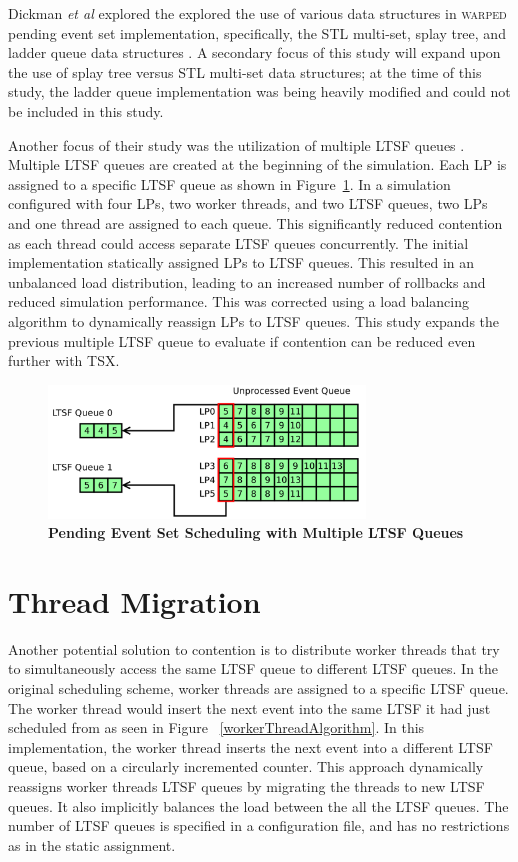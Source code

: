 \documentclass[11pt]{book}
\begin{document}
Dickman \emph{et al} explored the explored the use of various data structures in \textsc{warped}
pending event set implementation, specifically, the STL multi-set, splay tree, and ladder
queue data structures \cite{dickman}.  A secondary focus of this study will expand upon
the use of splay tree versus STL multi-set data structures; at the time of this study, the
ladder queue implementation was being heavily modified and could not be included in this
study.

Another focus of their study was the utilization of multiple LTSF queues \cite{dickman}.
Multiple LTSF queues are created at the beginning of the simulation.  Each LP is assigned
to a specific LTSF queue as shown in Figure~\ref{fig:multipleLTSF}.  In a simulation
configured with four LPs, two worker threads, and two LTSF queues, two LPs and one thread
are assigned to each queue.  This significantly reduced contention as each thread could
access separate LTSF queues concurrently.  The initial implementation statically assigned
LPs to LTSF queues.  This resulted in an unbalanced load distribution, leading to an
increased number of rollbacks and reduced simulation performance.  This was corrected
using a load balancing algorithm to dynamically reassign LPs to LTSF queues.  This study
expands the previous multiple LTSF queue to evaluate if contention can be reduced even
further with TSX.

\begin{figure}[H]
    \centering
    \graphicspath{ {./figures/} }
    \includegraphics[width=0.75\textwidth,keepaspectratio]{multiple_ltsf}
    \caption{\textbf{Pending Event Set Scheduling with Multiple LTSF
        Queues}}\label{fig:multipleLTSF}
\end{figure}

\section{Thread Migration}

Another potential solution to contention is to distribute worker threads that
try to simultaneously access the same LTSF queue to different LTSF queues.  In
the original scheduling scheme, worker threads are assigned to a specific LTSF
queue.  The worker thread would insert the next event into the same LTSF it had
just scheduled from as seen in Figure ~\ref{workerThreadAlgorithm}.  In this
implementation, the worker thread inserts the next event into a different LTSF
queue, based on a circularly incremented counter.  This approach dynamically
reassigns worker threads LTSF queues by migrating the threads to new LTSF
queues.  It also implicitly balances the load between the all the LTSF queues.
The number of LTSF queues is specified in a configuration file, and has no
restrictions as in the static assignment.
\end{document}
